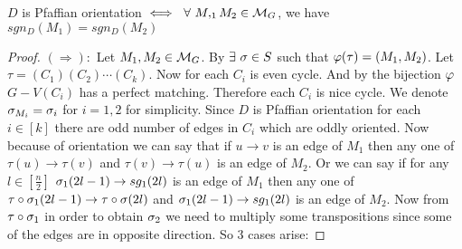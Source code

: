 \begin{lemma}\label{lmpfmatchingsign}
	$D$ is Pfaffian orientation $\iff\ \forall \ M,_1M_2\in\mcM_G$, we have  $sgn_D(M_1)=sgn_D(M_2)$
\end{lemma}
\begin{proof}
	$(\Rightarrow):$ Let $M_1,M_2\in \mathcal{M}_G$. By   $\exists\ \sigma\in S$ such that $\varphi(\tau)=(M_1,M_2)$. Let $\tau=(C_1)(C_2)\cdots (C_k)$. Now for each $C_i$ is even cycle. And by the bijection $\varphi$ $G-V(C_i)$ has a perfect matching. Therefore each $C_i$ is nice cycle. We denote $\sigma_{M_i}=\sigma_i$ for $i=1,2$ for simplicity. Since $D$ is Pfaffian orientation for each $i\in [k]$ there are odd number of edges in $C_i$ which are oddly oriented. Now because of orientation we can say that if $u\to v$ is an edge of $M_1$ then any one  of $\tau(u)\to \tau(v)$ and $\tau(v)\to \tau(u)$ is an edge of $M_2$. Or we can say if for any $l\in [\frac{n}2]$ $\sigma_1(2l-1)\to sg_1(2l)$ is an edge of $M_1$ then any one of $\tau\circ \sigma_1(2l-1)\to \tau\circ\sigma(2l)$ and $\sigma_1(2l-1)\to sg_1(2l)$ is an edge of $M_2$. Now from $\tau\circ\sigma_1$ in order to obtain $\sigma_2$ we need to multiply some transpositions since some of the edges are in opposite direction. So 3 cases arise:
	

\end{proof}
